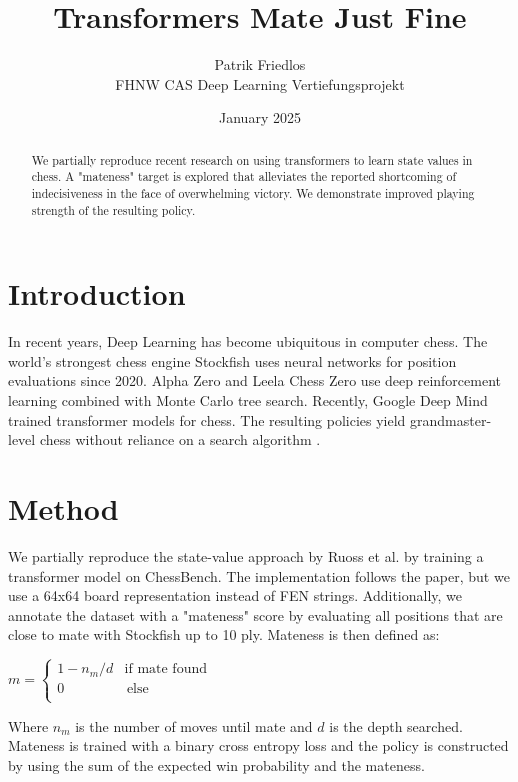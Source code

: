 \documentclass{article}
\title{Transformers Mate Just Fine}
\author{Patrik Friedlos\\FHNW CAS Deep Learning Vertiefungsprojekt}
\date{January 2025}
\begin{document}
\maketitle

\begin{abstract}
We partially reproduce recent research on using transformers to learn state values in chess. A "mateness" target is explored that alleviates the reported shortcoming of indecisiveness in the face of overwhelming victory. We demonstrate improved playing strength of the resulting policy.
\end{abstract}

\begin{multicols}{2}

\section{Introduction}

In recent years, Deep Learning has become ubiquitous in computer chess. The world's strongest chess engine Stockfish uses neural networks for position evaluations since 2020. Alpha Zero and Leela Chess Zero use deep reinforcement learning combined with Monte Carlo tree search. Recently, Google Deep Mind trained transformer models for chess. The resulting policies yield grandmaster-level chess without reliance on a search algorithm \cite{ruossamortized}.

\section{Method}

We partially reproduce the state-value approach by Ruoss et al. by training a transformer model on ChessBench. The implementation follows the paper, but we use a 64x64 board representation instead of FEN strings. Additionally, we annotate the dataset with a "mateness" score by evaluating all positions that are close to mate with Stockfish up to 10 ply. Mateness is then defined as:

$m = \left\{
\begin{array}{ll}
1 - n_m / d & \textrm{if mate found} \\
0 & \, \textrm{else} \\
\end{array}
\right. $

Where $n_m$ is the number of moves until mate and $d$ is the depth searched. Mateness is trained with a binary cross entropy loss and the policy is constructed by using the sum of the expected win probability and the mateness.



\end{multicols}
\end{document}
